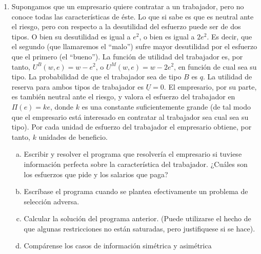 \documentclass[10pt,a4paper]{article}
\begin{document}
\begin{enumerate}
	\item Supongamos que un empresario quiere contratar a un trabajador, pero no conoce todas las características de éste. Lo que si sabe es que es neutral ante el riesgo, pero con respecto a la desutilidad del esfuerzo puede ser de dos tipos. O bien su desutilidad es igual a $e^{2}$, o bien es igual a $2e^{2}$. Es decir, que el segundo (que llamaremos el ``malo'') sufre mayor desutilidad por el esfuerzo que el primero (el ``bueno''). La función de utilidad del trabajador es, por tanto, $U^{B}(w, e)=w-e^{2}$, o $U^{M}(w, e)=w-2 e^{2}$, en función de cual sea su tipo. La probabilidad de que el trabajador sea de tipo $B$ es $q$. La utilidad de reserva para ambos tipos de trabajador es $\underline{U}=0$. El empresario, por su parte, es también neutral ante el riesgo, y valora el esfuerzo del trabajador en $\Pi( e)=k e$, donde $k$ es una constante suficientemente grande (de tal modo que el empresario está interesado en contratar al trabajador sea cual sea su tipo). Por cada unidad de esfuerzo del trabajador el empresario obtiene, por tanto, $k$ unidades de beneficio.
		\begin{enumerate}[a)]
			\item Escribir y resolver el programa que resolvería el empresario si tuviese información perfecta sobre la característica del trabajador. ¿Cuáles son los esfuerzos que pide y los salarios que paga?
			\item Escríbase el programa cuando se plantea efectivamente un problema de selección adversa.
			\item Calcular la solución del programa anterior. (Puede utilizarse el hecho de que algunas restricciones no están saturadas, pero justifiquese si se hace).
			\item Compárense los casos de información simétrica y asimétrica
		\end{enumerate}
		

\end{enumerate}
\end{document}
